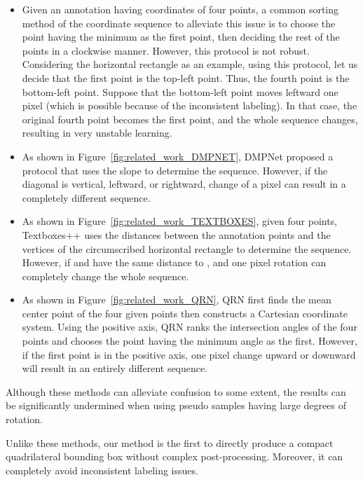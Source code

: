 \begin{itemize}
    \item Given an annotation having coordinates of four points, a common sorting method of the coordinate sequence to alleviate this issue is to choose the point having the minimum  as the first point, then deciding the rest of the points in a clockwise manner. However, this protocol is not robust. 
    Considering the horizontal rectangle as an example, using this protocol, let us decide that the first point is the top-left point. Thus, the fourth point is the bottom-left point. Suppose
    that
    the bottom-left point moves leftward one pixel (which is possible because of the inconsistent labeling). In that case, the original fourth point becomes the first point, and the whole sequence changes, resulting in very unstable learning. 
    
    \item As shown in Figure~\ref{fig:related_work_DMPNET}, DMPNet \cite{liu2017deep} proposed a protocol that uses the slope to determine the sequence. However, if the diagonal is vertical, leftward, or rightward,  change
    of a pixel
    can result in a completely different sequence.
    
    \item As shown in Figure~\ref{fig:related_work_TEXTBOXES}, given four points, Textboxes++ \cite{liao2018textboxes++} uses the distances between the annotation points and the vertices of the circumscribed horizontal rectangle to {determine} the sequence. However, if  and  have the same distance to , and one pixel rotation can completely change the whole sequence. 
    \item As shown in Figure~\ref{fig:related_work_QRN}, QRN \cite{he2018end} first finds the mean center point of the four given points then constructs a Cartesian coordinate system. Using the positive  axis, QRN ranks the intersection angles of the four points and chooses the point having the minimum angle as the first. However, if the first point is in the positive  axis, one pixel change upward or downward will result in an entirely different sequence.
\end{itemize}
Although these methods \cite{liu2017deep,liao2018textboxes++,he2018end} can alleviate  confusion to some extent, the results can be significantly undermined when using pseudo samples having large degrees of rotation. 

Unlike these methods, our method is the first to directly produce a compact quadrilateral bounding box without complex post-processing. Moreover, it can completely avoid inconsistent labeling issues.

